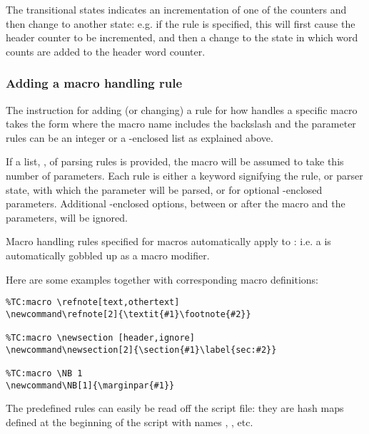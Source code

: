 \documentclass{article}
\begin{document}
The transitional states indicates an incrementation of one of the counters and then change to another state: e.g. if the  rule is specified, this will first cause the header counter to be incremented, and then a change to the  state in which word counts are added to the header word counter. 

\subsubsection{Adding a macro handling rule}

The \TeXcount{} instruction for adding (or changing) a rule for how \TeXcount{} handles a specific macro takes the form
where the macro name includes the backslash and the parameter rules can be an integer or a \code{[]}-enclosed list as explained above.

If a list, , of parsing rules is provided, the macro will be assumed to take this number of parameters. Each rule is either a keyword signifying the rule, or parser state, with which the parameter will be parsed, or  for optional \code{[]}-enclosed parameters. Additional \code{[]}-enclosed options, between or after the macro and the parameters, will be ignored.

Macro handling rules specified for macros  automatically apply to : i.e. a \code{*} is automatically gobbled up as a macro modifier. 

Here are some examples together with corresponding macro definitions:

\begin{lstlisting}
%TC:macro \refnote[text,othertext]
\newcommand\refnote[2]{\textit{#1}\footnote{#2}}

%TC:macro \newsection [header,ignore]
\newcommand\newsection[2]{\section{#1}\label{sec:#2}}

%TC:macro \NB 1
\newcommand\NB[1]{\marginpar{#1}}
\end{lstlisting}

The predefined rules can easily be read off the script file: they are hash maps defined at the beginning of the script with names , , etc.
\end{document}
